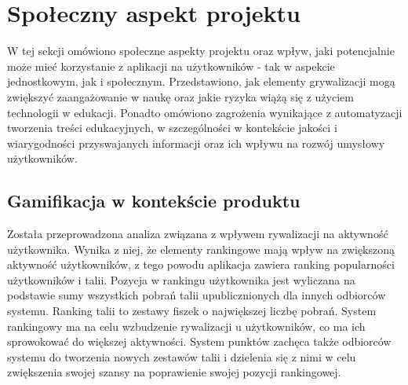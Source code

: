 \section{Społeczny aspekt projektu}

W tej sekcji omówiono społeczne aspekty projektu oraz wpływ, jaki potencjalnie może mieć korzystanie z aplikacji na użytkowników - tak w aspekcie jednostkowym, jak i społecznym. Przedstawiono, jak elementy grywalizacji mogą zwiększyć zaangażowanie w naukę oraz jakie ryzyka wiążą się z użyciem technologii w edukacji. Ponadto omówiono zagrożenia wynikające z automatyzacji tworzenia treści edukacyjnych, w szczególności w kontekście jakości i wiarygodności przyswajanych informacji oraz ich wpływu na rozwój umysłowy użytkowników.

\subsection{Gamifikacja w kontekście produktu}
Została przeprowadzona analiza związana z wpływem rywalizacji na aktywność użytkownika. Wynika z niej, że elementy rankingowe mają wpływ na zwiększoną aktywność użytkowników, z tego powodu aplikacja zawiera ranking popularności użytkowników i talii.\cite{ablyGamification} Pozycja w rankingu użytkownika jest wyliczana na podstawie sumy wszystkich pobrań talii upublicznionych dla innych odbiorców systemu. Ranking talii to zestawy fiszek o największej liczbę pobrań. System rankingowy ma na celu wzbudzenie rywalizacji u użytkowników, co ma ich sprowokować do większej aktywności. System punktów zachęca także odbiorców systemu do tworzenia nowych zestawów talii i dzielenia się z nimi w celu zwiększenia swojej szansy na poprawienie swojej pozycji rankingowej.


